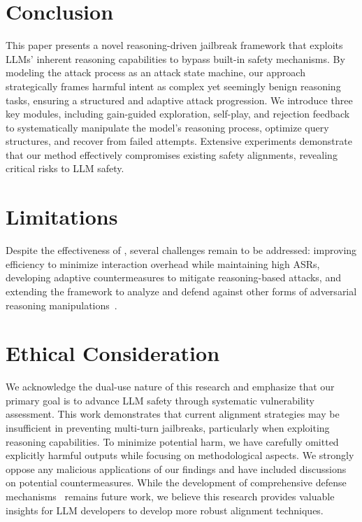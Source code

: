 \section{Conclusion}
This paper presents a novel reasoning-driven jailbreak framework that exploits LLMs’ inherent reasoning capabilities to bypass built-in safety mechanisms. By modeling the attack process as an attack state machine, our approach strategically frames harmful intent as complex yet seemingly benign reasoning tasks, ensuring a structured and adaptive attack progression. We introduce three key modules, including gain-guided exploration, self-play, and rejection feedback to systematically manipulate the model’s reasoning process, optimize query structures, and recover from failed attempts. Extensive experiments demonstrate that our method effectively compromises existing safety alignments, revealing critical risks to LLM safety.

\section{Limitations}
Despite the effectiveness of \method{}, several challenges remain to be addressed:  improving efficiency to minimize interaction overhead while maintaining high ASRs,  developing adaptive countermeasures to mitigate reasoning-based attacks, and  extending the framework to analyze and defend against other forms of adversarial reasoning manipulations~\cite{wang2025black, zhang2024visual}.

\section{Ethical Consideration}
We acknowledge the dual-use nature of this research and emphasize that our primary goal is to advance LLM safety through systematic vulnerability assessment. This work demonstrates that current alignment strategies may be insufficient in preventing multi-turn jailbreaks, particularly when exploiting reasoning capabilities. To minimize potential harm, we have carefully omitted explicitly harmful outputs while focusing on methodological aspects. We strongly oppose any malicious applications of our findings and have included discussions on potential countermeasures. While the development of comprehensive defense mechanisms~\cite{liu2023exploring, liang2024unlearning} remains future work, we believe this research provides valuable insights for LLM developers to develop more robust alignment techniques.